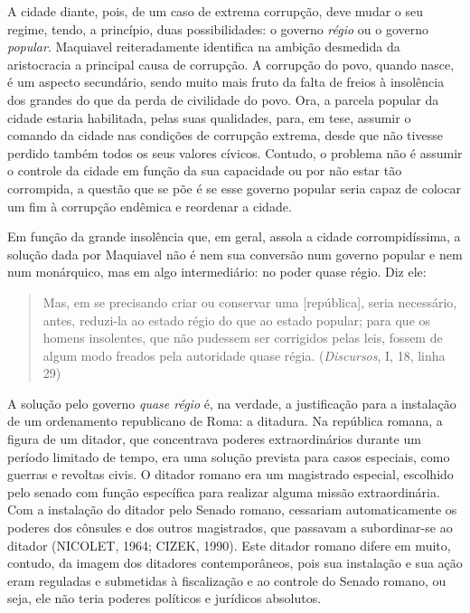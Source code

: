 A cidade diante, pois, de um caso de extrema corrupção, deve mudar o seu
regime, tendo, a princípio, duas possibilidades: o governo \emph{régio}
ou o governo \emph{popular}. Maquiavel reiteradamente identifica na
ambição desmedida da aristocracia a principal causa de corrupção. A
corrupção do povo, quando nasce, é um aspecto secundário, sendo muito
mais fruto da falta de freios à insolência dos grandes do que da perda
de civilidade do povo. Ora, a parcela popular da cidade estaria
habilitada, pelas suas qualidades, para, em tese, assumir o comando da
cidade nas condições de corrupção extrema, desde que não tivesse perdido
também todos os seus valores cívicos. Contudo, o problema não é assumir
o controle da cidade em função da sua capacidade ou por não estar tão
corrompida, a questão que se põe é se esse governo popular seria capaz
de colocar um fim à corrupção endêmica e reordenar a cidade.

Em função da grande insolência que, em geral, assola a cidade
corrompidíssima, a solução dada por Maquiavel não é nem sua conversão
num governo popular e nem num monárquico, mas em algo intermediário: no
poder quase régio. Diz ele:

\begin{quote}
Mas, em se precisando criar ou conservar uma {[}república{]}, seria
necessário, antes, reduzi-la ao estado régio do que ao estado popular;
para que os homens insolentes, que não pudessem ser corrigidos pelas
leis, fossem de algum modo freados pela autoridade quase régia.
(\emph{Discursos}, I, 18, linha 29)
\end{quote}

A solução pelo governo \emph{quase régio} é, na verdade, a justificação
para a instalação de um ordenamento republicano de Roma: a ditadura. Na
república romana, a figura de um ditador, que concentrava poderes
extraordinários durante um período limitado de tempo, era uma solução
prevista para casos especiais, como guerras e revoltas civis. O ditador
romano era um magistrado especial, escolhido pelo senado com função
específica para realizar alguma missão extraordinária. Com a instalação
do ditador pelo Senado romano, cessariam automaticamente os poderes dos
cônsules e dos outros magistrados, que passavam a subordinar-se ao
ditador (NICOLET, 1964; CIZEK, 1990). Este ditador romano difere em
muito, contudo, da imagem dos ditadores contemporâneos, pois sua
instalação e sua ação eram reguladas e submetidas à fiscalização e ao
controle do Senado romano, ou seja, ele não teria poderes políticos e
jurídicos absolutos.


